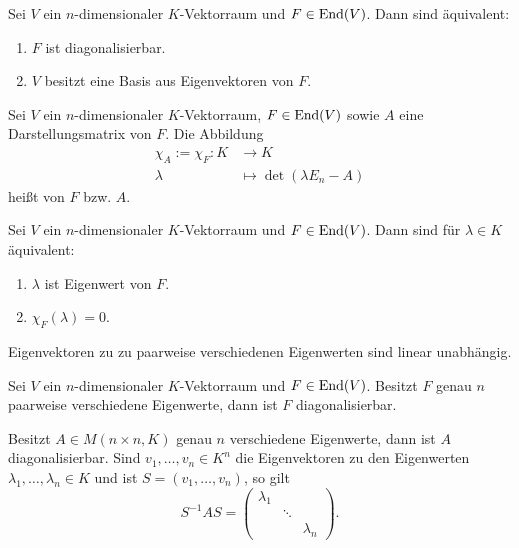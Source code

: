 \setcounter{definition}{8}
\begin{satz}
	\label{satz:I.16.9}
	Sei $V$ ein $n$-dimensionaler $K$-Vektorraum und $F \in \operatorname{End}(V)$.
	Dann sind äquivalent:
	\begin{enumerate}[(1)]
		\item $F$ ist diagonalisierbar.
		\item $V$ besitzt eine Basis aus Eigenvektoren von $F$.
	\end{enumerate}
\end{satz}

\setcounter{definition}{10}
\begin{definition}
	\label{def:I.16.11}
	Sei $V$ ein $n$-dimensionaler $K$-Vektorraum, $F \in \operatorname{End}(V)$ sowie $A$ eine Darstellungsmatrix von $F$.
	Die Abbildung
	\begin{align*}
		\chi_A := \chi_F \colon K &\longrightarrow K \\
		\lambda &\longmapsto \det(\lambda E_n - A)
	\end{align*}
	heißt  von $F$ bzw. $A$.
\end{definition}

\begin{satz}
	\label{satz:I.16.12}
	Sei $V$ ein $n$-dimensionaler $K$-Vektorraum und $F \in \operatorname{End}(V)$.
	Dann sind für $\lambda \in K$ äquivalent:
	\begin{enumerate}[(1)]
		\item $\lambda$ ist Eigenwert von $F$.
		\item $\chi_F(\lambda) = 0$.
	\end{enumerate}
\end{satz}

\setcounter{definition}{13}
\begin{lemma}
	\label{def:I.16.14}
	Eigenvektoren zu zu paarweise verschiedenen Eigenwerten sind linear unabhängig.
\end{lemma}

\begin{satz}
	\label{satz:I.16.15}
	Sei $V$ ein $n$-dimensionaler $K$-Vektorraum und $F \in \operatorname{End}(V)$.
	Besitzt $F$ genau $n$ paarweise verschiedene Eigenwerte, dann ist $F$ diagonalisierbar.
\end{satz}

\begin{satz}
	\label{satz:I.16.16}
	Besitzt $A \in M(n \times n,K)$ genau $n$ verschiedene Eigenwerte, dann ist $A$ diagonalisierbar.
	Sind $v_1,\dots,v_n \in K^n$ die Eigenvektoren zu den Eigenwerten $\lambda_1,\dots,\lambda_n \in K$ und ist $S = (v_1,\dots,v_n)$, so gilt
	\[
		S^{-1}AS = \begin{pmatrix}
		\lambda_1 &  &  \\ 
		& \ddots &  \\ 
		&  & \lambda_n
		\end{pmatrix}.
	\]
\end{satz}

